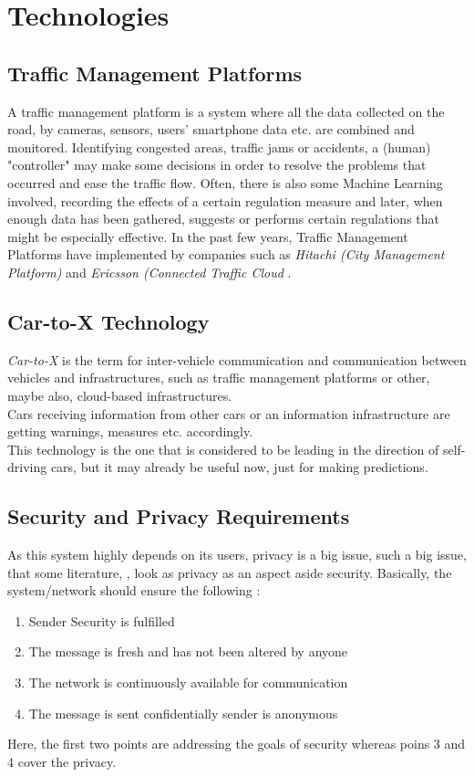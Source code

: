 \section{Technologies}

\subsection{Traffic Management Platforms}
A traffic management platform is a system where all the data collected on the road, by cameras, sensors, users' smartphone data etc. are combined and monitored. Identifying congested areas, traffic jams or accidents, a (human) "controller" may make some decisions in order to resolve the problems that occurred and ease the traffic flow. Often, there is also some Machine Learning involved, recording the effects of a certain regulation measure and later, when enough data has been gathered, suggests or performs certain regulations that might be especially effective.
In the past few years, Traffic Management Platforms have implemented by companies such as \textit{Hitachi (City Management Platform)} \cite{cityManagementPlatform} and \textit{Ericsson (Connected Traffic Cloud} \cite{ericsson}.

\subsection{Car-to-X Technology}
\textit{Car-to-X} is the term for inter-vehicle communication and communication between vehicles and infrastructures, such as traffic management platforms or other, maybe also, cloud-based infrastructures.\\
Cars receiving information from other cars or an information infrastructure are getting warnings, measures etc. accordingly.\\
This technology is the one that is considered to be leading in the direction of self-driving cars, but it may already be useful now, just for making predictions.

\subsection{Security and Privacy Requirements}
As this system highly depends on its users, privacy is a big issue, such a big issue, that some literature, \cite{book}, look as privacy as an aspect aside security.
Basically, the system/network should ensure the following \cite{book}:
\begin{enumerate}
    \item Sender Security is fulfilled
    \item The message is fresh and has not been altered by anyone
    \item The network is continuously available for communication
    \item The message is sent confidentially
    \The sender is anonymous
\end{enumerate}
 
 Here, the first two points are addressing the goals of security whereas poins 3 and 4 cover the privacy.